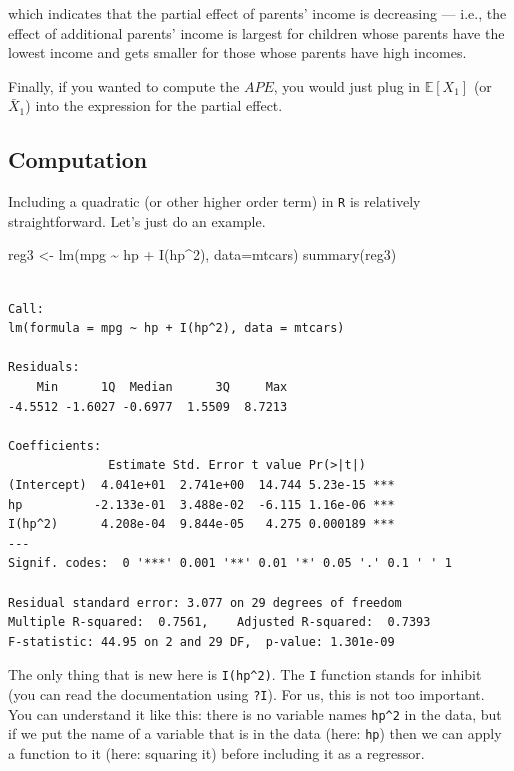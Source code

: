 \documentclass[
  letterpaper,
  DIV=11,
  numbers=noendperiod]{scrreprt}
\newenvironment{Shaded}{\begin{snugshade}}{\end{snugshade}}
\newcommand{\AttributeTok}[1]{\textcolor[rgb]{0.40,0.45,0.13}{#1}}
\newcommand{\DecValTok}[1]{\textcolor[rgb]{0.68,0.00,0.00}{#1}}
\newcommand{\FunctionTok}[1]{\textcolor[rgb]{0.28,0.35,0.67}{#1}}
\newcommand{\NormalTok}[1]{\textcolor[rgb]{0.00,0.23,0.31}{#1}}
\newcommand{\OtherTok}[1]{\textcolor[rgb]{0.00,0.23,0.31}{#1}}
\newcommand{\SpecialCharTok}[1]{\textcolor[rgb]{0.37,0.37,0.37}{#1}}
\begin{document}
which indicates that the partial effect of parents' income is decreasing
--- i.e., the effect of additional parents' income is largest for
children whose parents have the lowest income and gets smaller for those
whose parents have high incomes.

Finally, if you wanted to compute the \(APE\), you would just plug in
\(\mathbb{E}[X_1]\) (or \(\bar{X}_1\)) into the expression for the
partial effect.

\subsection{Computation}\label{computation-3}

Including a quadratic (or other higher order term) in \texttt{R} is
relatively straightforward. Let's just do an example.

\begin{Shaded}
\begin{Highlighting}[]
\NormalTok{reg3 }\OtherTok{\textless{}{-}} \FunctionTok{lm}\NormalTok{(mpg }\SpecialCharTok{\textasciitilde{}}\NormalTok{ hp }\SpecialCharTok{+} \FunctionTok{I}\NormalTok{(hp}\SpecialCharTok{\^{}}\DecValTok{2}\NormalTok{), }\AttributeTok{data=}\NormalTok{mtcars)}
\FunctionTok{summary}\NormalTok{(reg3)}
\end{Highlighting}
\end{Shaded}

\begin{verbatim}

Call:
lm(formula = mpg ~ hp + I(hp^2), data = mtcars)

Residuals:
    Min      1Q  Median      3Q     Max 
-4.5512 -1.6027 -0.6977  1.5509  8.7213 

Coefficients:
              Estimate Std. Error t value Pr(>|t|)    
(Intercept)  4.041e+01  2.741e+00  14.744 5.23e-15 ***
hp          -2.133e-01  3.488e-02  -6.115 1.16e-06 ***
I(hp^2)      4.208e-04  9.844e-05   4.275 0.000189 ***
---
Signif. codes:  0 '***' 0.001 '**' 0.01 '*' 0.05 '.' 0.1 ' ' 1

Residual standard error: 3.077 on 29 degrees of freedom
Multiple R-squared:  0.7561,    Adjusted R-squared:  0.7393 
F-statistic: 44.95 on 2 and 29 DF,  p-value: 1.301e-09
\end{verbatim}

The only thing that is new here is \texttt{I(hp\^{}2)}. The \texttt{I}
function stands for inhibit (you can read the documentation using
\texttt{?I}). For us, this is not too important. You can understand it
like this: there is no variable names \texttt{hp\^{}2} in the data, but
if we put the name of a variable that is in the data (here: \texttt{hp})
then we can apply a function to it (here: squaring it) before including
it as a regressor.
\end{document}
